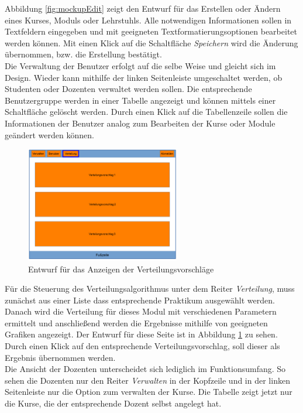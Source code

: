         	Abbildung \ref{fig:mockupEdit} zeigt den Entwurf für das Erstellen oder Ändern eines Kurses, Moduls oder Lehrstuhls.
        	Alle notwendigen Informationen sollen in Textfeldern eingegeben und mit geeigneten Textformatierungsoptionen bearbeitet werden können.
        	Mit einen Klick auf die Schaltfläche \textit{Speichern} wird die Änderung übernommen, bzw. die Erstellung bestätigt.\\
        	
        	Die Verwaltung der Benutzer erfolgt auf die selbe Weise und gleicht sich im Design.
        	Wieder kann mithilfe der linken Seitenleiste umgeschaltet werden, ob Studenten oder Dozenten verwaltet werden sollen.
        	Die entsprechende Benutzergruppe werden in einer Tabelle angezeigt und können mittels einer Schaltfläche gelöscht werden.
        	Durch einen Klick auf die Tabellenzeile sollen die Informationen der Benutzer analog zum Bearbeiten der Kurse oder Module  geändert werden können.\\
            
            \begin{figure}[t]
                \centering
                \includegraphics[width=0.6\textwidth]{./design/images/MockUpsBackend/backendDistribution.png}
                \caption{Entwurf für das Anzeigen der Verteilungsvorschläge}
                \label{fig:mockupDistribution}
            \end{figure}
        	
        	Für die Steuerung des Verteilungsalgorithmus unter dem Reiter \textit{Verteilung}, muss zunächst aus einer Liste dass entsprechende Praktikum ausgewählt werden.
            Danach wird die Verteilung für dieses Modul mit verschiedenen Parametern ermittelt und anschließend werden die Ergebnisse mithilfe von geeigneten Grafiken angezeigt.
            Der Entwurf für diese Seite ist in Abbildung \ref{fig:mockupDistribution} zu sehen.
            Durch einen Klick auf den entsprechende Verteilungsvorschlag, soll dieser als Ergebnis übernommen werden.\\
        	
        	Die Ansicht der Dozenten unterscheidet sich lediglich im Funktionsumfang.
        	So sehen die Dozenten nur den Reiter \textit{Verwalten} in der Kopfzeile und in der linken Seitenleiste nur die Option zum verwalten der Kurse.
        	Die Tabelle zeigt jetzt nur die Kurse, die der entsprechende Dozent selbst angelegt hat.  
        	
        	
        	
        	
        	
        	
        	
        	
        	
